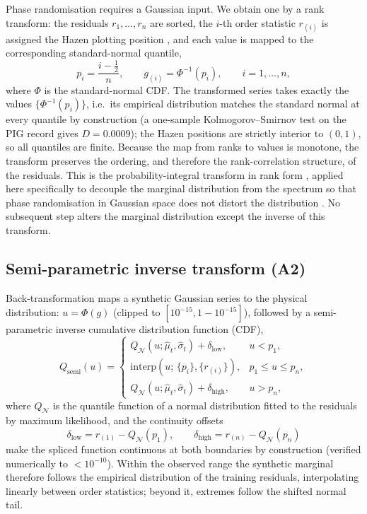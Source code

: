 Phase randomisation requires a Gaussian input. We obtain one by a rank
transform: the residuals $r_1,\dots,r_n$ are sorted, the $i$-th order
statistic $r_{(i)}$ is assigned the Hazen plotting position
\citep{hazen1914}, and each value is mapped to the corresponding
standard-normal quantile,
\begin{equation}\label{eq:rank}
  p_i=\frac{i-\tfrac{1}{2}}{n},
  \qquad
  g_{(i)}=\Phi^{-1}(p_i),
  \qquad i=1,\dots,n,
\end{equation}
where $\Phi$ is the standard-normal CDF. The transformed series takes
exactly the values $\{\Phi^{-1}(p_i)\}$, i.e.\ its empirical distribution
matches the standard normal at every quantile by construction (a one-sample
Kolmogorov--Smirnov test on the PIG record gives $D=0.0009$); the Hazen
positions are strictly interior to $(0,1)$, so all quantiles are finite.
Because the map from ranks to values is monotone, the transform preserves
the ordering, and therefore the rank-correlation structure, of the
residuals. This is the probability-integral
transform in rank form \citep{rosenblatt1952}, applied here specifically to
decouple the marginal distribution from the spectrum so that phase
randomisation in Gaussian space does not distort the distribution
\citep{theiler1992}. No subsequent step alters the marginal distribution
except the inverse of this transform.

\subsection{Semi-parametric inverse transform (A2)}\label{sec:inv}

Back-transformation maps a synthetic Gaussian series to the physical
distribution: $u=\Phi(g)$ (clipped to $[10^{-15},1-10^{-15}]$), followed by
a semi-parametric inverse cumulative distribution function (CDF),
\begin{equation}\label{eq:qsemi}
  Q_{\mathrm{semi}}(u)=
  \begin{cases}
    Q_{\mathcal{N}}(u;\hat\mu_t,\hat\sigma_t)+\delta_{\mathrm{low}},
      & u < p_1,\\[2pt]
    \mathrm{interp}\!\left(u;\,\{p_i\},\{r_{(i)}\}\right),
      & p_1 \le u \le p_n,\\[2pt]
    Q_{\mathcal{N}}(u;\hat\mu_t,\hat\sigma_t)+\delta_{\mathrm{high}},
      & u > p_n,
  \end{cases}
\end{equation}
where $Q_{\mathcal{N}}$ is the quantile function of a normal distribution
fitted to the residuals by maximum likelihood, and the continuity offsets
\begin{equation}\label{eq:delta}
  \delta_{\mathrm{low}} = r_{(1)}-Q_{\mathcal{N}}(p_1),
  \qquad
  \delta_{\mathrm{high}} = r_{(n)}-Q_{\mathcal{N}}(p_n)
\end{equation}
make the spliced function continuous at both boundaries by construction
(verified numerically to $<10^{-10}$). Within the observed range the
synthetic marginal therefore follows the empirical distribution of the
training residuals, interpolating linearly between order statistics; beyond
it, extremes follow the shifted normal tail.

